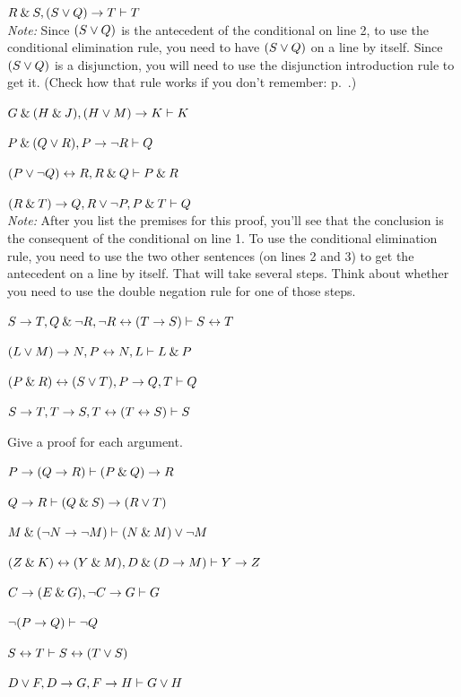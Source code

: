 {{{{{{{{{\begin{small}
\begin{earg}
\item $R \mathbin{\&} S, (S \vee Q) \rightarrow T \vdash T$\\
\textit{Note:} Since $(S \vee Q)$ is the antecedent of the conditional on line 2, to use the conditional elimination rule, you need to have $(S \vee Q)$ on a line by itself. Since $(S \vee Q)$ is a disjunction, you will need to use the disjunction introduction rule to get it. (Check how that rule works if you don't remember: p.~\pageref{di-rule-box}.)
\medskip

\item $G \mathbin{\&} (H \mathbin{\&} J), (H \vee M) \rightarrow K \vdash K$\smallskip
\item $P \mathbin{\&} (Q \vee R), P \rightarrow {\neg} R \vdash Q$\smallskip
\item $(P \vee {\neg} Q) \leftrightarrow R, R \mathbin{\&} Q \vdash P \mathbin{\&} R$\smallskip
\item $(R \mathbin{\&} T) \rightarrow Q, R \vee {\neg} P, P \mathbin{\&} T \vdash Q$\\
\textit{Note:} After you list the premises for this proof, you'll see that the conclusion is the consequent of the conditional on line 1. To use the conditional elimination rule, you need to use the two other sentences (on lines 2 and 3) to get the antecedent on a line by itself. That will take several steps. Think about whether you need to use the double negation rule for one of those steps. 
\medskip

\item $S \rightarrow T, Q \mathbin{\&} {\neg} R, {\neg} R \leftrightarrow (T \rightarrow S) \vdash S \leftrightarrow T $\smallskip
\item $(L \vee M) \rightarrow N, P \leftrightarrow N, L \vdash L \mathbin{\&} P$\smallskip
\item $(P \mathbin{\&} R) \leftrightarrow (S \vee T), P \rightarrow Q, T \vdash Q$\smallskip
\item $S \rightarrow T, T \rightarrow S, T \leftrightarrow (T \leftrightarrow S) \vdash S$\smallskip
\end{earg}


\problempart
Give a proof for each argument.
\begin{earg}
\item $P \rightarrow (Q \rightarrow R) \vdash (P \mathbin{\&} Q) \rightarrow R$\smallskip
\item $Q \rightarrow R \vdash (Q \mathbin{\&} S) \rightarrow (R \vee T)$\smallskip 
\item $M \mathbin{\&} ({\neg} N \rightarrow {\neg} M) \vdash (N \mathbin{\&} M) \vee {\neg} M$\smallskip
\item $(Z\mathbin{\&} K)\leftrightarrow(Y\mathbin{\&} M), D\mathbin{\&}(D\rightarrow M) \vdash Y\rightarrow Z$\smallskip
\item $C\rightarrow(E\mathbin{\&} G), {\neg} C \rightarrow G \vdash G$\smallskip
\item ${\neg}(P \rightarrow Q) \vdash {\neg} Q$\smallskip
\item $S \leftrightarrow T \vdash S \leftrightarrow (T \vee S)$\smallskip 
\item $D \vee F, D \rightarrow G, F \rightarrow H \vdash G \vee H$\smallskip
\end{earg}



\end{small}}}}}}}}}}
